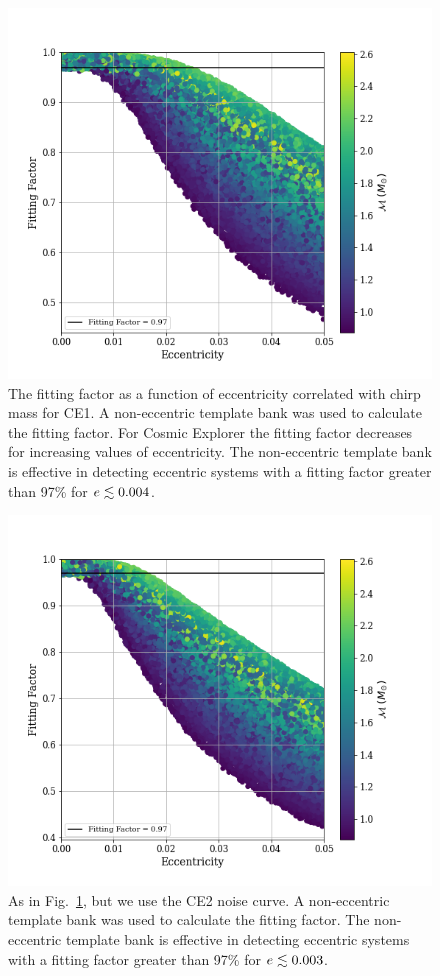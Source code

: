 \begin{figure}
    \includegraphics[width=1.1\columnwidth]{Figures/3G-bns-search-prospects/non-eccen-ff-mchirp-CE1.png}
    \caption{The fitting factor as a function of eccentricity correlated with chirp mass for CE1. A non-eccentric template bank was used to calculate the fitting factor. For Cosmic Explorer the fitting factor decreases for increasing values of eccentricity. The non-eccentric template bank is effective in detecting eccentric systems with a fitting factor greater than 97\% for $e \lesssim 0.004$.}
\label{Fig:ff-circ-CE1}
\end{figure}
\begin{figure}
    \includegraphics[width=1.15\columnwidth]{Figures/3G-bns-search-prospects/non-eccen-ff-mchirp-CE2.png}
    \caption{As in Fig.~\ref{Fig:ff-circ-CE1}, but we use the CE2 noise curve. A non-eccentric template bank was used to calculate the fitting factor. The non-eccentric template bank is effective in detecting eccentric systems with a fitting factor greater than 97\% for $e \lesssim 0.003$.}
\label{Fig:ff-circ-CE2}
\end{figure}

